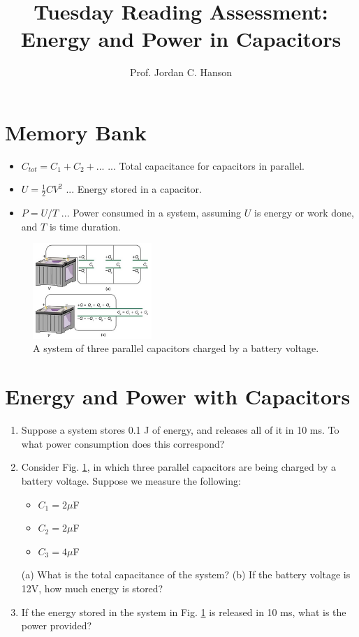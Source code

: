 \documentclass{article}
\begin{document}
\title{Tuesday Reading Assessment: Energy and Power in Capacitors}
\author{Prof. Jordan C. Hanson}

\maketitle

\section{Memory Bank}

\begin{itemize}
\item $C_{tot} = C_1+C_2 + ...$ ... Total capacitance for capacitors in parallel.
\item $U = \frac{1}{2} C V^2$ ... Energy stored in a capacitor.
\item $P = U/T$ ... Power consumed in a system, assuming $U$ is energy or work done, and $T$ is time duration.
\end{itemize}

\begin{figure}
\centering
\includegraphics[width=0.4\textwidth]{figures/cap3.png}
\caption{\label{fig:c} A system of three parallel capacitors charged by a battery voltage.}
\end{figure}

\section{Energy and Power with Capacitors}

\begin{enumerate}
\item Suppose a system stores 0.1 J of energy, and releases all of it in 10 ms.  To what power consumption does this correspond? \\ \vspace{1cm}
\item Consider Fig. \ref{fig:c}, in which three parallel capacitors are being charged by a battery voltage.  Suppose we measure the following:
\begin{itemize}
\item $C_1 = 2\mu$F
\item $C_2 = 2\mu$F
\item $C_3 = 4\mu$F
\end{itemize}
(a) What is the total capacitance of the system? (b) If the battery voltage is 12V, how much energy is stored? \\ 
\item If the energy stored in the system in Fig. \ref{fig:c} is released in 10 ms, what is the power provided?
\end{enumerate}
\end{document}
